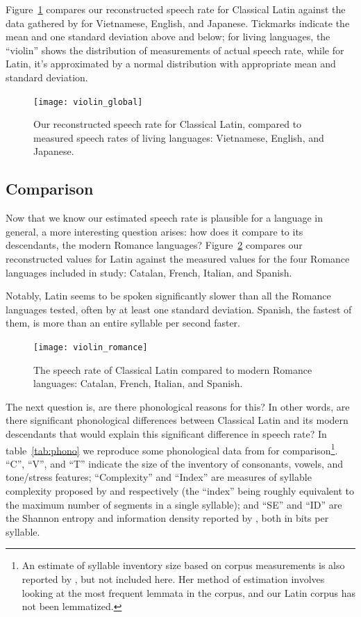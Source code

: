 \documentclass[12pt,twoside]{article}
\begin{document}
Figure~\ref{fig:violin1} compares our reconstructed speech rate for Classical Latin against the data gathered by \citet{coupé} for Vietnamese, English, and Japanese. Tickmarks indicate the mean and one standard deviation above and below; for living languages, the ``violin'' shows the distribution of measurements of actual speech rate, while for Latin, it's approximated by a normal distribution with appropriate mean and standard deviation.

\begin{figure}[p]
\centering
\caption{Our reconstructed speech rate for Classical Latin, compared to measured speech rates of living languages: Vietnamese, English, and Japanese.}
\label{fig:violin1}
\noindent\texttt{[image: violin\_global]}
\end{figure}

\subsection{Comparison}

Now that we know our estimated speech rate is plausible for a language in general, a more interesting question arises: how does it compare to its descendants, the modern Romance languages? Figure~\ref{fig:violin2} compares our reconstructed values for Latin against the measured values for the four Romance languages included in  study: Catalan, French, Italian, and Spanish.

Notably, Latin seems to be spoken significantly slower than all the Romance languages tested, often by at least one standard deviation. Spanish, the fastest of them, is more than an entire syllable per second faster.

\begin{figure}[p]
\centering
\caption{The speech rate of Classical Latin compared to modern Romance languages: Catalan, French, Italian, and Spanish.}
\label{fig:violin2}
\noindent\texttt{[image: violin\_romance]}
\end{figure}

The next question is, are there phonological reasons for this? In other words, are there significant phonological differences between Classical Latin and its modern descendants that would explain this significant difference in speech rate? In table~\ref{tab:phono} we reproduce some phonological data from \citet{oh} for comparison\footnote{An estimate of syllable inventory size based on corpus measurements is also reported by \citet{oh}, but not included here. Her method of estimation involves looking at the most frequent lemmata in the corpus, and our Latin corpus has not been lemmatized.}. ``C'', ``V'', and ``T'' indicate the size of the inventory of consonants, vowels, and tone/stress features; ``Complexity'' and ``Index'' are measures of syllable complexity proposed by \citet{wals} and \citet{lapsyd} respectively (the ``index'' being roughly equivalent to the maximum number of segments in a single syllable); and ``SE'' and ``ID'' are the Shannon entropy and information density reported by \citet{oh}, both in bits per syllable.
\end{document}
